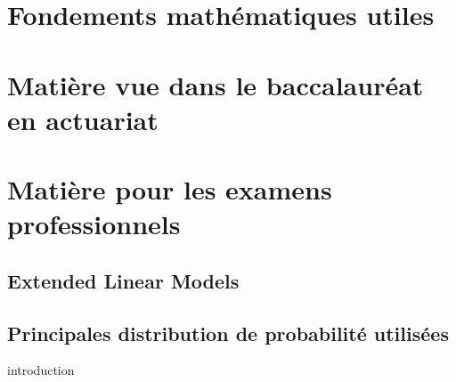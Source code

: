 \documentclass[oneside, 12pt, french]{book}
\begin{document}


\frontmatter %



{
    \hypersetup{linkcolor=tocColor}
    \bfseries %
    \tableofcontents
}
\newpage

\mainmatter %

\part{Fondements mathématiques utiles}


\label{Chapter:NotionCalculs}


\label{Chapter:AlgebreLineaire}


\part{Matière vue dans le baccalauréat en actuariat}


\label{Chapter:ProbEtStatistique}


\label{Chapter:MathematiqueFinanciere}


\label{Chapter:ProcessusAleatoires}


\label{Chapter:TheorieDuRisque}


\part{Matière pour les examens professionnels}


\label{Chapter:SerieChronologique}

\chapter{Extended Linear Models}

\label{Chapter:ExtendedLinearModels}

\appendix
\chapter{Principales distribution de probabilité utilisées}
introduction


\label{Appendix:PreuveImportante}


\label{Appendix:GitWorkflow}
\end{document}
